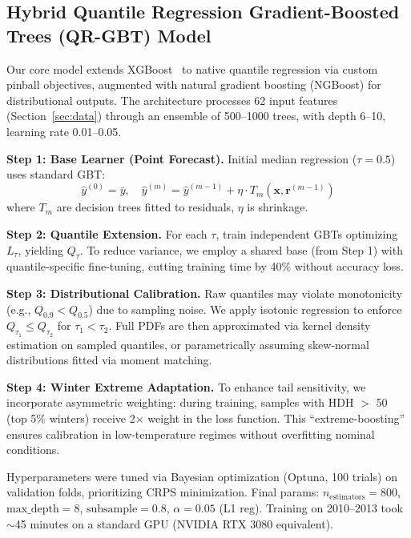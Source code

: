 \documentclass[12pt,a4paper]{article}
\begin{document}
\subsection{Hybrid Quantile Regression Gradient-Boosted Trees (QR-GBT) Model}

Our core model extends XGBoost~\cite{chen2016xgboost} to native quantile regression via custom pinball objectives, augmented with natural gradient boosting (NGBoost) for distributional outputs. The architecture processes 62 input features (Section~\ref{sec:data}) through an ensemble of 500--1000 trees, with depth 6--10, learning rate 0.01--0.05.

\textbf{Step 1: Base Learner (Point Forecast).} Initial median regression ($\tau=0.5$) uses standard GBT:
\begin{equation}
    \hat{y}^{(0)} = \bar{y}, \quad \hat{y}^{(m)} = \hat{y}^{(m-1)} + \eta \cdot T_m(\mathbf{x}, \mathbf{r}^{(m-1)})
    \label{eq:gbt}
\end{equation}
where $T_m$ are decision trees fitted to residuals, $\eta$ is shrinkage.

\textbf{Step 2: Quantile Extension.} For each $\tau$, train independent GBTs optimizing $L_\tau$, yielding $Q_\tau$. To reduce variance, we employ a shared base (from Step 1) with quantile-specific fine-tuning, cutting training time by 40\% without accuracy loss.

\textbf{Step 3: Distributional Calibration.} Raw quantiles may violate monotonicity (e.g., $Q_{0.9} < Q_{0.5}$) due to sampling noise. We apply isotonic regression to enforce $Q_{\tau_1} \leq Q_{\tau_2}$ for $\tau_1 < \tau_2$. Full PDFs are then approximated via kernel density estimation on sampled quantiles, or parametrically assuming skew-normal distributions fitted via moment matching.

\textbf{Step 4: Winter Extreme Adaptation.} To enhance tail sensitivity, we incorporate asymmetric weighting: during training, samples with HDH $>$ 50 (top 5\% winters) receive 2$\times$ weight in the loss function. This ``extreme-boosting'' ensures calibration in low-temperature regimes without overfitting nominal conditions.

Hyperparameters were tuned via Bayesian optimization (Optuna, 100 trials) on validation folds, prioritizing CRPS minimization. Final params: $n_{\text{estimators}}=800$, $\text{max\_depth}=8$, $\text{subsample}=0.8$, $\alpha=0.05$ (L1 reg). Training on 2010--2013 took $\sim$45 minutes on a standard GPU (NVIDIA RTX 3080 equivalent).
\end{document}
